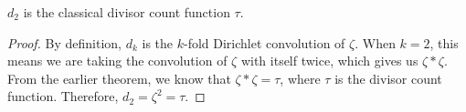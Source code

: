 \begin{theorem}[d two]
\label{d_two}
\leanok
$d_2$ is the classical divisor count function $\tau$.
\end{theorem}
\begin{proof}
\leanok
By definition, $d_k$ is the $k$-fold Dirichlet convolution of $\zeta$. When $k = 2$, this means we are taking the convolution of $\zeta$ with itself twice, which gives us $\zeta * \zeta$. From the earlier theorem, we know that $\zeta * \zeta = \tau$, where $\tau$ is the divisor count function. Therefore, $d_2 = \zeta^2 = \tau$.
\end{proof}
